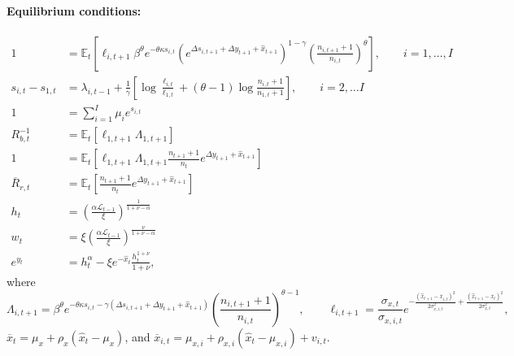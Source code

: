 \paragraph{Equilibrium conditions:}\small
\begin{align}
            1 &= \mathbb{E}_{t}\left[ \ell_{i,t+1} \beta^\theta e^{-\theta \kappa s_{i,t}} \left( e^{\Delta s_{i,t+1} + \Delta y_{t+1} + \hat{x}_{t+1}} \right)^{1-\gamma} \left( \frac{n_{i,t+1}+1}{n_{i,t}} \right)^{\theta} \right], \qquad i= 1, \ldots, I\\
            s_{i,t} - s_{1,t} &= \lambda_{i,t-1}+ \frac{1}{\gamma} \left[ \log \frac{\ell_{i,t}}{\ell_{1,t}} + (\theta-1) \log \frac{n_{i,t}+1}{n_{1,t}+1} \right], \qquad i = 2, \ldots I\\
            1 &= \sum_{i=1}^I\mu_i e^{s_{i,t}}\\
            R_{b,t}^{-1} &= \mathbb{E}_{t}\left[ \ell_{1,t+1} \Lambda_{1,t+1} \right]\\
            1 &= \mathbb{E}_t\left[ \ell_{1,t+1} \Lambda_{1,t+1} \frac{n_{t+1}+1}{n_t} e^{\Delta y_{t+1} + \hat{x}_{t+1}} \right]\\
            \overline{R}_{r,t} &= \mathbb{E}_t\left[ \frac{n_{t+1}+1}{n_t} e^{\Delta y_{t+1} + \hat{x}_{t+1}} \right]\\
            h_{t} &= \left( \frac{\alpha \mathcal{L}_{t-1}}{\xi} \right)^{\frac{1}{1+\nu-\alpha}}\\
             w_t &= \xi \left( \frac{\alpha \mathcal{L}_{t-1}}{\xi} \right)^{\frac{\nu}{1+\nu-\alpha}}\\
             e^{y_t} &= h_t^\alpha - \xi e^{-\hat{x}_t} \frac{h_t^{1+\nu}}{1+\nu},
\end{align}\normalsize
where\small
\begin{equation}
    \Lambda_{i,t+1} = \beta^\theta  e^{-\theta \kappa s_{i,t}-\gamma \left(\Delta s_{i,t+1} + \Delta y_{t+1} + \hat{x}_{t+1}\right)}  \left( \frac{n_{i,t+1}+1}{n_{i,t}} \right)^{\theta-1}, \qquad 
    \ell_{i,t+1} = \frac{\sigma_{x,t}}{\sigma_{x,i,t}} e^{-\frac{(\hat{x}_{t+1} - \overline{x}_{i,t})^2}{2\sigma_{x,i,t}^2} + \frac{(\hat{x}_{t+1} - \overline{x}_t)^2}{2\sigma_{x,t}^2}},
\end{equation}\normalsize
$\overline{x}_t = \mu_x + \rho_x (\hat{x}_{t}-\mu_x)$, and $\overline{x}_{i,t} = \mu_{x,i} + \rho_{x,i} (\hat{x}_{t}-\mu_{x,i}) + v_{i,t}$.

